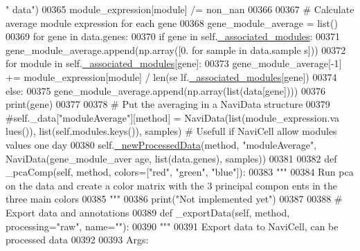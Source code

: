 \begin{DoxyCode}
       \textcolor{stringliteral}{" data"})
00365             module\_expression[module] /= non\_nan
00366 
00367         \textcolor{comment}{# Calculate average module expression for each gene}
00368         gene\_module\_average = list()
00369         \textcolor{keywordflow}{for} gene \textcolor{keywordflow}{in} data.genes:
00370             \textcolor{keywordflow}{if} gene \textcolor{keywordflow}{in} self.\hyperlink{classnavicom_1_1navicom_1_1NaviCom_abc04e5310dba9a8c2dd2037281464727}{_associated_modules}:
00371                 gene\_module\_average.append(np.array([0. \textcolor{keywordflow}{for} sample \textcolor{keywordflow}{in} data.sample
      s]))
00372                 \textcolor{keywordflow}{for} module \textcolor{keywordflow}{in} self.\hyperlink{classnavicom_1_1navicom_1_1NaviCom_abc04e5310dba9a8c2dd2037281464727}{_associated_modules}[gene]:
00373                     gene\_module\_average[-1] += module\_expression[module] / len(se
      lf.\hyperlink{classnavicom_1_1navicom_1_1NaviCom_abc04e5310dba9a8c2dd2037281464727}{_associated_modules}[gene])
00374             \textcolor{keywordflow}{else}:
00375                 gene\_module\_average.append(np.array(list(data[gene])))
00376                 \textcolor{keywordflow}{print}(gene)
00377 
00378         \textcolor{comment}{# Put the averaging in a NaviData structure}
00379         \textcolor{comment}{#self.\_data["moduleAverage"][method] = NaviData(list(module\_expression.va
      lues()), list(self.modules.keys()), samples) # Usefull if NaviCell allow modules 
      values one day}
00380         self.\hyperlink{classnavicom_1_1navicom_1_1NaviCom_acf8b9094fa76cafefb910daeb68b7e5d}{_newProcessedData}(method, \textcolor{stringliteral}{"moduleAverage"}, NaviData(gene\_module\_aver
      age, list(data.genes), samples))
00381 
00382     \textcolor{keyword}{def }\_pcaComp(self, method, colors=["red", "green", "blue"]):
00383         \textcolor{stringliteral}{"""}
00384 \textcolor{stringliteral}{        Run pca on the data and create a color matrix with the 3 principal compon
      ents in the three main colors}
00385 \textcolor{stringliteral}{        """}
00386         \textcolor{keywordflow}{print}(\textcolor{stringliteral}{"Not implemented yet"})
00387 
00388     \textcolor{comment}{# Export data and annotations}
00389     \textcolor{keyword}{def }\_exportData(self, method, processing="raw", name=""):
00390         \textcolor{stringliteral}{"""}
00391 \textcolor{stringliteral}{        Export data to NaviCell, can be processed data}
00392 \textcolor{stringliteral}{}
00393 \textcolor{stringliteral}{        Args:}

\end{DoxyCode}
